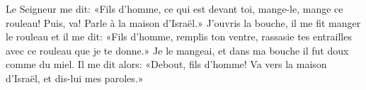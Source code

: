 Le Seigneur me dit: «Fils d’homme, ce qui est devant toi, mange-le, mange ce rouleau!
	Puis, va! Parle à la maison d’Israël.»
J’ouvris la bouche, il me fit manger le rouleau et il me dit:
	«Fils d’homme, remplis ton ventre,
	rassasie tes entrailles avec ce rouleau que je te donne.»
Je le mangeai, et dans ma bouche il fut doux comme du miel.
Il me dit alors: «Debout, fils d’homme!
	Va vers la maison d’Israël, et dis-lui mes paroles.»
